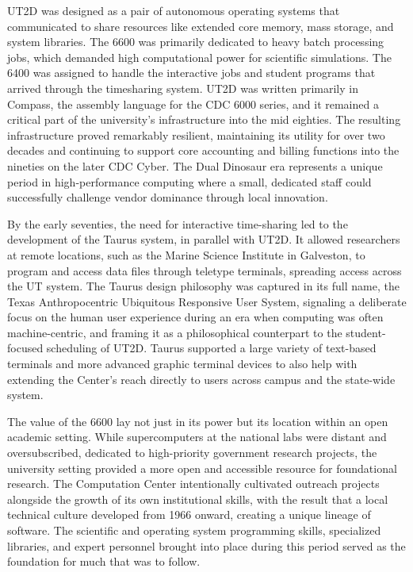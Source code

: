 UT2D was designed as a pair of autonomous operating systems that communicated to share resources like extended core memory, mass storage, and system libraries. The 6600 was primarily dedicated to heavy batch processing jobs, which demanded high computational power for scientific simulations. The 6400 was assigned to handle the interactive jobs and student programs that arrived through the timesharing system. UT2D was written primarily in Compass, the assembly language for the CDC 6000 series, and it remained a critical part of the university’s infrastructure into the mid eighties. The resulting infrastructure proved remarkably resilient, maintaining its utility for over two decades and continuing to support core accounting and billing functions into the nineties on the later CDC Cyber. The Dual Dinosaur era represents a unique period in high-performance computing where a small, dedicated staff could successfully challenge vendor dominance through local innovation. 

By the early seventies, the need for interactive time-sharing led to the development of the Taurus system, in parallel with UT2D. It allowed researchers at remote locations, such as the Marine Science Institute in Galveston, to program and access data files through teletype terminals, spreading access across the UT system. The Taurus design philosophy was captured in its full name, the Texas Anthropocentric Ubiquitous Responsive User System, signaling a deliberate focus on the human user experience during an era when computing was often machine-centric, and framing it as a philosophical counterpart to the student-focused scheduling of UT2D. Taurus supported a large variety of text-based terminals and more advanced graphic terminal devices to also help with extending the Center's reach directly to users across campus and the state-wide system. 

The value of the 6600 lay not just in its power but its location within an open academic setting. While supercomputers at the national labs were distant and oversubscribed, dedicated to high-priority government research projects, the university setting provided a more open and accessible resource for foundational research. The Computation Center intentionally cultivated outreach projects alongside the growth of its own institutional skills, with the result that a local technical culture developed from 1966 onward, creating a unique lineage of software. The scientific and operating system programming skills, specialized libraries, and expert personnel brought into place during this period served as the foundation for much that was to follow.

